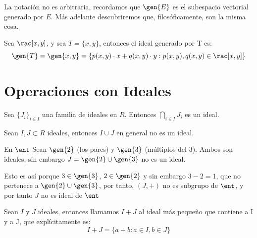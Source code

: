 La notación no es arbitraria, recordamos que $\gen{E}$ es el subespacio vectorial generado por $E$. Más adelante descubriremos que, filosóficamente, son la misma cosa.

\begin{example} Sea $\rac[x,y]$, y sea $T=\{x,y\}$, entonces el ideal generado por T es:
	$$\gen{T} = \gen{x,y} = \{p(x,y)\cdot x+q(x,y)\cdot y : p(x,y),q(x,y) \in \rac[x,y]\}$$
\end{example}

\section{Operaciones con Ideales}

\begin{prop}
	Sea $\{J_i\}_{i\in I}$ una familia de ideales en $R$. Entonces $\bigcap_{i \in I}J_i$ es un ideal.
\end{prop}


\begin{prop}
	Sean $I,J \subset R$ ideales, entonces $I \cup J$ en general no es un ideal.
\end{prop}

\begin{example} En $\ent$
	Sean $\gen{2}$ (los pares) y $\gen{3}$ (múltiplos del 3). Ambos son ideales, sin embargo $J=\gen{2} \cup \gen{3}$ no es un ideal.

	Esto es así porque $3\in \gen{3}$, $2 \in \gen{2}$ y sin embargo $3-2=1$, que no pertenece a $\gen{2} \cup \gen{3}$, por tanto, $(J,+)$ no es subgrupo de $\ent$, y por tanto $J$ no es ideal de $\ent$
\end{example}

\begin{defn} \label{def:IdealSuma}
Sean $I$ y $J$ ideales, entonces llamamos $I+J$ al ideal más pequeño que contiene a I y a J, que explícitamente es:
$$ I+J = \{a+b: a\in I, b\in J\} $$



\end{defn}

